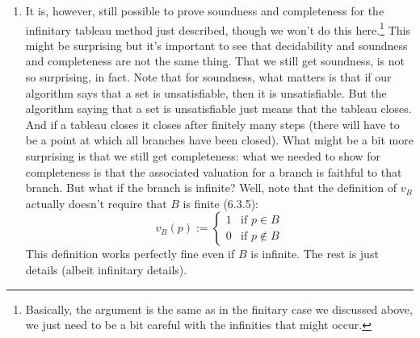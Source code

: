 \begin{enumerate}[\thesection.1]
		\item It is, however, still possible to prove soundness and completeness for the infinitary tableau method just described, though we won't do this here.\footnote{Basically, the argument is the same as in the finitary case we discussed above, we just need to be a bit careful with the infinities that might occur.} This might be surprising but it's important to see that decidability and soundness and completeness are not the same thing. That we still get soundness, is not so surprising, in fact. Note that for soundness, what matters is that if our algorithm says that a set is unsatisfiable, then it is unsatisfiable. But the algorithm saying that a set is unsatisfiable just means that the tableau closes. And if a tableau closes it closes after finitely many steps (there will have to be a point at which all branches have been closed). What might be a bit more surprising is that we still get completeness: what we needed to show for completeness is that the associated valuation for a branch is faithful to that branch. But what if the branch is infinite? Well, note that the definition of $v_B$ actually doesn't require that $B$ is finite (6.3.5):
		\[v_B(p):=\begin{cases} 1 &\text{if }p\in B\\0&\text{if }p\notin B\end{cases}\]	
		This definition works perfectly fine even if $B$ is infinite. The rest is just details (albeit infinitary details).
		

\end{enumerate}

